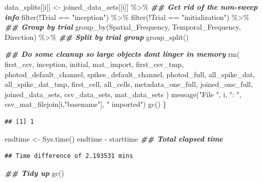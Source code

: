 \documentclass[
]{book}
\newenvironment{Shaded}{\begin{snugshade}}{\end{snugshade}}
\newcommand{\DocumentationTok}[1]{\textcolor[rgb]{0.56,0.35,0.01}{\textbf{\textit{#1}}}}
\newcommand{\FunctionTok}[1]{\textcolor[rgb]{0.00,0.00,0.00}{#1}}
\newcommand{\NormalTok}[1]{#1}
\newcommand{\OtherTok}[1]{\textcolor[rgb]{0.56,0.35,0.01}{#1}}
\newcommand{\SpecialCharTok}[1]{\textcolor[rgb]{0.00,0.00,0.00}{#1}}
\newcommand{\StringTok}[1]{\textcolor[rgb]{0.31,0.60,0.02}{#1}}
\begin{document}
\begin{Shaded}
\begin{Highlighting}[]
\NormalTok{  data\_splits[[i]] }\OtherTok{\textless{}{-}}
\NormalTok{    joined\_data\_sets[[i]] }\SpecialCharTok{\%\textgreater{}\%}
    \DocumentationTok{\#\# Get rid of the non{-}sweep info}
    \FunctionTok{filter}\NormalTok{(}\SpecialCharTok{!}\NormalTok{Trial }\SpecialCharTok{==} \StringTok{"inception"}\NormalTok{) }\SpecialCharTok{\%\textgreater{}\%}
    \FunctionTok{filter}\NormalTok{(}\SpecialCharTok{!}\NormalTok{Trial }\SpecialCharTok{==} \StringTok{"initialization"}\NormalTok{) }\SpecialCharTok{\%\textgreater{}\%}
    \DocumentationTok{\#\# Group by trial}
    \FunctionTok{group\_by}\NormalTok{(Spatial\_Frequency, Temporal\_Frequency, Direction) }\SpecialCharTok{\%\textgreater{}\%}
    \DocumentationTok{\#\# Split by trial group}
    \FunctionTok{group\_split}\NormalTok{()}

  \DocumentationTok{\#\# Do some cleanup so large objects don\textquotesingle{}t linger in memory}
  \FunctionTok{rm}\NormalTok{(}
\NormalTok{    first\_csv, inception, initial, mat\_import, first\_csv\_tmp,}
\NormalTok{    photod\_default\_channel, spikes\_default\_channel, photod\_full,}
\NormalTok{    all\_spike\_dat, all\_spike\_dat\_tmp, first\_cell, all\_cells,}
\NormalTok{    metadata\_one\_full, joined\_one\_full, joined\_data\_sets,}
\NormalTok{    csv\_data\_sets, mat\_data\_sets}
\NormalTok{  )}
  \FunctionTok{message}\NormalTok{(}\StringTok{"File "}\NormalTok{, i, }\StringTok{": "}\NormalTok{, csv\_mat\_filejoin[i,}\StringTok{"basename"}\NormalTok{], }\StringTok{" imported"}\NormalTok{)}
  \FunctionTok{gc}\NormalTok{()}
\NormalTok{\}}
\end{Highlighting}
\end{Shaded}

\begin{verbatim}
## [1] 1
\end{verbatim}

\begin{Shaded}
\begin{Highlighting}[]
\NormalTok{endtime }\OtherTok{\textless{}{-}} \FunctionTok{Sys.time}\NormalTok{()}
\NormalTok{endtime }\SpecialCharTok{{-}}\NormalTok{ starttime }\DocumentationTok{\#\# Total elapsed time}
\end{Highlighting}
\end{Shaded}

\begin{verbatim}
## Time difference of 2.193531 mins
\end{verbatim}

\begin{Shaded}
\begin{Highlighting}[]
\DocumentationTok{\#\# Tidy up}
\FunctionTok{gc}\NormalTok{()}
\end{Highlighting}
\end{Shaded}
\end{document}
